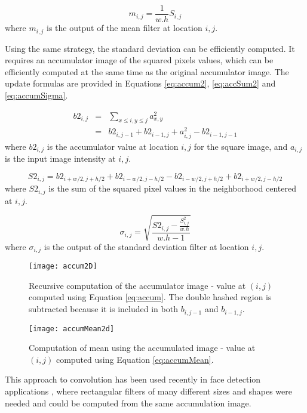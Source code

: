\documentclass[a4paper]{InsightArticle}
\begin{document}
\begin{equation}
\label{eq:accumMean}
m_{i,j} = \frac{1}{w.h}S_{i,j}
\end{equation}
where $m_{i,j}$ is the output of the mean filter at location $i,j$.

Using the same strategy, the standard deviation can be efficiently
computed.  It requires an accumulator image of the squared pixels
values, which can be efficiently computed at the same time as the
original accumulator image. The update formulas are provided in
Equations \ref{eq:accum2}, \ref{eq:accSum2} and \ref{eq:accumSigma}.

\begin{eqnarray}
\label{eq:accum2}
b2_{i,j} & = & \sum_{x \leq i, y \leq j} a_{x,y}^2 \\ \nonumber
	& = & b2_{i,j-1} + b2_{i-1, j} + a_{i,j}^2 - b2_{i-1, j-1}
\end{eqnarray}
where $b2_{i,j}$ is the accumulator value at location $i,j$ for the square image, and $a_{i,j}$ is the input image intensity at $i,j$.

\begin{equation}
\label{eq:accSum2}
S2_{i,j} = b2_{i+w/2,j+h/2} + b2_{i-w/2,j-h/2} - b2_{i-w/2,j+h/2} + b2_{i+w/2,j-h/2}
\end{equation}
where $S2_{i,j}$ is the sum of the squared pixel values in the neighborhood centered at $i,j$.

\begin{equation}
\label{eq:accumSigma}
\sigma_{i,j} = \sqrt{\frac{S2_{i,j} - \frac{S_{i,j}^2}{w.h}}{w.h-1}}
\end{equation}
where $\sigma_{i,j}$ is the output of the standard deviation filter at location $i,j$.

\begin{figure}[htbp]
\centering
\texttt{[image: accum2D]}
\caption{Recursive computation of the accumulator image - value at $(i,j)$ computed using Equation \ref{eq:accum}. The double hashed region is subtracted because it is included in both $b_{i,j-1}$ and $b_{i-1, j}$.\label{fig:accum}}
\end{figure}

\begin{figure}[htbp]
\centering
\texttt{[image: accumMean2d]}
\caption{Computation of mean using the accumulated image - value at $(i,j)$ computed using Equation \ref{eq:accumMean}.\label{fig:accumMean}}
\end{figure}

This approach to convolution has been used recently in face detection
applications \cite{Viola2004}, where rectangular filters of many
different sizes and shapes were needed and could be computed from the same accumulation image.
\end{document}
